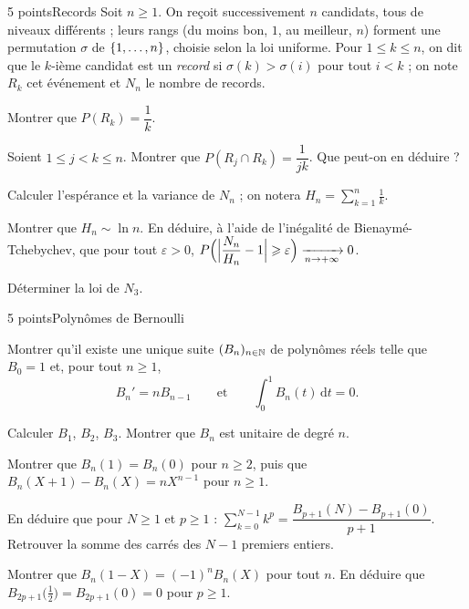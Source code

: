\begin{exoEval}{5 points}{Records}
Soit $n\geqslant1$. On reçoit successivement $n$ candidats, tous de niveaux
différents ; leurs rangs (du moins bon, $1$, au meilleur, $n$) forment une
permutation $\sigma$ de $\left\{1,\dots,n\right\}$, choisie selon la loi uniforme.
Pour $1\leqslant k\leqslant n$, on dit que le $k$-ième candidat est un
\emph{record} si $\sigma(k)>\sigma(i)$ pour tout $i<k$ ; on note $R_k$ cet
événement et $N_n$ le nombre de records.
\begin{questions}
  \item Montrer que $P(R_k)=\dfrac1k$.
  \item Soient $1\leqslant j<k\leqslant n$. Montrer que
    $P(R_j\cap R_k)=\dfrac{1}{jk}$. Que peut-on en déduire ?
  \item Calculer l'espérance et la variance de $N_n$ ; on notera
    $H_n=\sum_{k=1}^{n}\frac1k$.
  \item Montrer que $H_n\sim\ln n$. En déduire, à l'aide de l'inégalité de
    Bienaymé-Tchebychev, que pour tout $\varepsilon>0$,
    $P\Bigl(\Bigl|\dfrac{N_n}{H_n}-1\Bigr|\geqslant\varepsilon\Bigr)\xrightarrow[n\to+\infty]{}0$.
  \item Déterminer la loi de $N_3$.
\end{questions}
\end{exoEval}

\begin{exoEval}{5 points}{Polynômes de Bernoulli}
\begin{questions}
  \item Montrer qu'il existe une unique suite $(B_n)_{n\in\mathbb{N}}$ de polynômes
    réels telle que $B_0=1$ et, pour tout $n\geqslant1$,
    \[B_n'=nB_{n-1}\qquad\text{et}\qquad\int_0^{1}B_n(t)\,\mathrm{d}t=0.\]
  \item Calculer $B_1$, $B_2$, $B_3$. Montrer que $B_n$ est unitaire de
    degré $n$.
  \item Montrer que $B_n(1)=B_n(0)$ pour $n\geqslant2$, puis que
    $B_n(X+1)-B_n(X)=nX^{n-1}$ pour $n\geqslant1$.
  \item En déduire que pour $N\geqslant1$ et $p\geqslant1$ :
    $\sum_{k=0}^{N-1}k^{p}=\dfrac{B_{p+1}(N)-B_{p+1}(0)}{p+1}$. Retrouver la
    somme des carrés des $N-1$ premiers entiers.
  \item Montrer que $B_n(1-X)=(-1)^{n}B_n(X)$ pour tout $n$. En déduire que
    $B_{2p+1}\bigl(\frac12\bigr)=B_{2p+1}(0)=0$ pour $p\geqslant1$.
\end{questions}
\end{exoEval}

